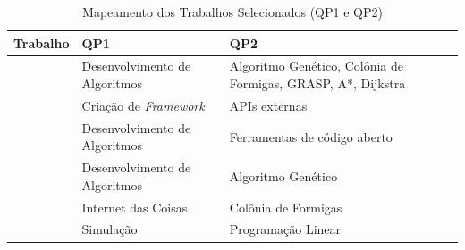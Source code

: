 \documentclass[conference,12pt]{IEEEtran}
\begin{document}
\begin{table}[htbp]
    \caption{Mapeamento dos Trabalhos Selecionados (QP1 e QP2)}
    \vspace{-0.7cm}
    \begin{center}
        \begin{tabular}{|p{1.5cm}|p{2.8cm}|p{3.3cm}|}
            \hline
            \textbf{Trabalho}  & \textbf{QP1}     & \textbf{QP2}                      \\
            \hline
            \cite{PAZ2023}     & Desenvolvimento de Algoritmos & Algoritmo Genético, Colônia de Formigas, GRASP, A*, Dijkstra \\
            \hline
            \cite{SILVA2024}   & Criação de \textit{Framework} & APIs externas                                                \\
            \hline
            \cite{SILVA2022}   & Desenvolvimento de Algoritmos & Ferramentas de código aberto                                 \\
            \hline
            \cite{VILLELA2017} & Desenvolvimento de Algoritmos & Algoritmo Genético                                           \\
            \hline
            \cite{BARTH2016}   & Internet das Coisas           & Colônia de Formigas                                          \\
            \hline
            \cite{SATI2020}    & Simulação                     & Programação Linear                                           \\
            \hline
        \end{tabular}
        \label{tab:mapeamento_qp}
    \end{center}
    \vspace{-0.7cm}
\end{table}




\end{document}
